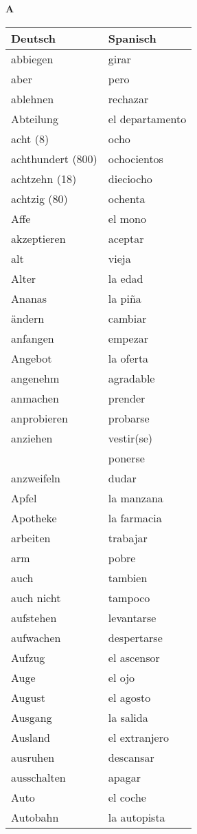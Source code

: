 \begin{flushright}\begin{Huge}\textbf{A}\end{Huge}\end{flushright}

\begin{longtable}{p{} p{}} 
\textbf{Deutsch}     & \textbf{Spanisch}                                       \\ \hline
\hline
\endhead %
abbiegen & girar\\
aber & pero\\
ablehnen & rechazar\\
Abteilung & el departamento\\
acht (8) & ocho\\
achthundert (800) & ochocientos\\
achtzehn (18) & dieciocho\\
achtzig (80) & ochenta\\
Affe & el mono\\
akzeptieren & aceptar\\
alt & vieja\\
Alter & la edad\\
Ananas & la piña\\
ändern & cambiar\\
anfangen & empezar\\
Angebot & la oferta \\
angenehm & agradable\\
anmachen & prender\\
anprobieren & probarse\\
anziehen & vestir(se)\\
~ & ponerse\\
anzweifeln & dudar\\
Apfel & la manzana \\
Apotheke & la farmacia\\
arbeiten & trabajar\\
arm & pobre\\
auch & tambien\\
auch nicht & tampoco\\
aufstehen & levantarse\\
aufwachen & despertarse\\
Aufzug & el ascensor\\
Auge & el ojo\\
August & el agosto\\
Ausgang & la salida\\
Ausland & el extranjero\\
ausruhen & descansar\\
ausschalten & apagar\\
Auto & el coche \\
Autobahn & la autopista\\
\end{longtable}
